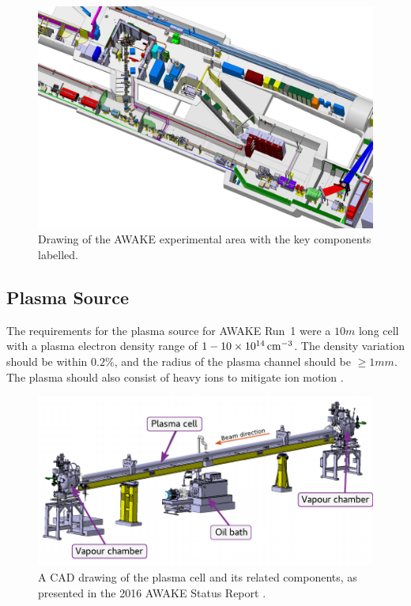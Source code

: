 \begin{figure}[hbt]
    \centering
    \includegraphics[width=0.99\linewidth,trim={0mm 0mm 0mm 0mm},clip]{figures/AwakeExperiment}
    \caption{\label{Fig:WFA:AWAKE}
        Drawing of the AWAKE experimental area with the key components labelled.
    }
\end{figure}

\subsection{Plasma Source}
\label{WFA:Design:Plasma}

The requirements for the plasma source for AWAKE Run~1 were a $10\unit{m}$ long cell with a plasma electron density range of $1-10\times 10^{14}\,\mathrm{cm}^{-3}$.
The density variation should be within $0.2\%$, and the radius of the plasma channel should be $\geq 1\unit{mm}$.
The plasma should also consist of heavy ions to mitigate ion motion \cite{caldwell:2015}.

\begin{figure}[hbt]
    \centering
    \includegraphics[width=0.99\linewidth,trim={0mm 0mm 0mm 0mm},clip]{figures/PlasmaCell}
    \caption{\label{Fig:WFA:PlasmaCell}
        A CAD drawing of the plasma cell and its related components, as presented in the 2016 AWAKE Status Report \cite{awake_collaboration:2016}.
    }
\end{figure}

